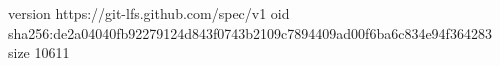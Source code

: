 version https://git-lfs.github.com/spec/v1
oid sha256:de2a04040fb92279124d843f0743b2109c7894409ad00f6ba6c834e94f364283
size 10611
